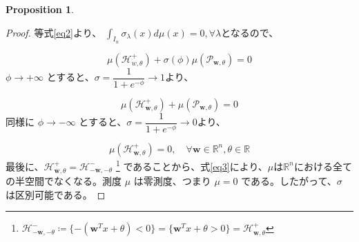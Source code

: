 \documentclass[a4paper]{jsarticle}
\theoremstyle{definition}
\newtheorem{prop}[dfn]{Proposition}
\begin{document}
\begin{prop}
\begin{proof}
等式\eqref{eq2}より、 $\int_{I_n} \sigma_\lambda(x) d\mu(x)=0,\forall \lambda $となるので、

\[
\mu(\mathcal{H}^+_{w,\theta}) + \sigma(\phi)\mu(\mathcal{P}_{\mathbf{w},\theta}) = 0
\]
$\phi \to +\infty$ とすると、$\sigma = \dfrac{1}{1+e^{-\phi}}\to 1$より、

\[
\mu(\mathcal{H}^+_{\mathbf{w},\theta}) + \mu(\mathcal{P}_{\mathbf{w},\theta}) = 0
\]
同様に $\phi \to -\infty$ とすると、$\sigma = \dfrac{1}{1+e^{-\phi}}\to 0$より、

\begin{equation}
  \mu(\mathcal{H}^+_{\mathbf{w},\theta}) = 0, \quad \forall \mathbf{w} \in \mathbb{R}^n, \theta \in \mathbb{R}\label{eq3}
\end{equation}
最後に、$\mathcal{H}^+_{\mathbf{w},\theta} = \mathcal{H}^-_{-\mathbf{w},-\theta}$ \footnote{$\mathcal{H}^-_{-\mathbf{w},-\theta}\coloneq \{-(\mathbf{w}^T x+\theta)<0\} =\{\mathbf{w}^T x+\theta >0\}=\mathcal{H}^+_{\mathbf{w},\theta}$}
であることから、式\eqref{eq3}により、$\mu$は$\mathbb{R}^n$における全ての半空間でなくなる。測度 $\mu$ は零測度、つまり $\mu = 0$ である。したがって、$\sigma$ は区別可能である。
\end{proof} 
\end{prop}
\end{document}
